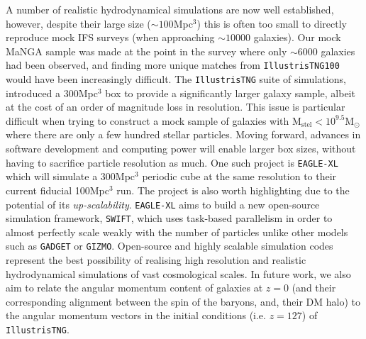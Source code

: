 A number of realistic hydrodynamical simulations are now well established, however, despite their large size ($\sim 100$Mpc$^3$) this is often too small to directly reproduce mock IFS surveys (when approaching $\sim 10000$ galaxies). Our mock MaNGA sample was made at the point in the survey where only $\sim$6000 galaxies had been observed, and finding more unique matches from \texttt{IllustrisTNG100} would have been increasingly difficult. The \texttt{IllustrisTNG} suite of simulations, introduced a 300Mpc$^3$ box to provide a significantly larger galaxy sample, albeit at the cost of an order of magnitude loss in resolution. This issue is particular difficult when trying to construct a mock sample of galaxies with $\mathrm{M_{stel} < 10^{9.5} M_{\odot}}$ where there are only a few hundred stellar particles. Moving forward, advances in software development and computing power will enable larger box sizes, without having to sacrifice particle resolution as much. One such project is \texttt{EAGLE-XL} which will simulate a 300Mpc$^{3}$ periodic cube at the same resolution to their current fiducial 100Mpc$^3$ run. The project is also worth highlighting due to the potential of its \textit{up-scalability}. \texttt{EAGLE-XL} aims to build a new open-source simulation framework, \texttt{SWIFT}, which uses task-based parallelism in order to almost perfectly scale weakly with the number of particles unlike other models such as \texttt{GADGET} or \texttt{GIZMO}. Open-source and highly scalable simulation codes represent the best possibility of realising high resolution and realistic hydrodynamical simulations of vast cosmological scales. In future work, we also aim to relate the angular momentum content of galaxies at $z=0$ (and their corresponding alignment between the spin of the baryons, and, their DM halo) to the angular momentum vectors in the initial conditions (i.e. $z = 127$) of \texttt{IllustrisTNG}.